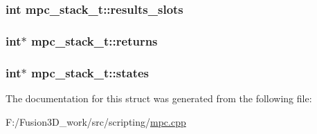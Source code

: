 \subsubsection[{results\+\_\+slots}]{\setlength{\rightskip}{0pt plus 5cm}int mpc\+\_\+stack\+\_\+t\+::results\+\_\+slots}\label{structmpc__stack__t_ab67a2d3f222c307628c9dc1ab06f68d9}
\hypertarget{structmpc__stack__t_a547db90cb6af79ae6c65e1e74c0d16bb}{}
\subsubsection[{returns}]{\setlength{\rightskip}{0pt plus 5cm}int$\ast$ mpc\+\_\+stack\+\_\+t\+::returns}\label{structmpc__stack__t_a547db90cb6af79ae6c65e1e74c0d16bb}
\hypertarget{structmpc__stack__t_a3c22e1d9055caa7e741e2cb209c3a291}{}
\subsubsection[{states}]{\setlength{\rightskip}{0pt plus 5cm}int$\ast$ mpc\+\_\+stack\+\_\+t\+::states}\label{structmpc__stack__t_a3c22e1d9055caa7e741e2cb209c3a291}


The documentation for this struct was generated from the following file\+:\begin{DoxyCompactItemize}
\item 
F\+:/\+Fusion3\+D\+\_\+work/src/scripting/\hyperlink{mpc_8cpp}{mpc.\+cpp}\end{DoxyCompactItemize}
